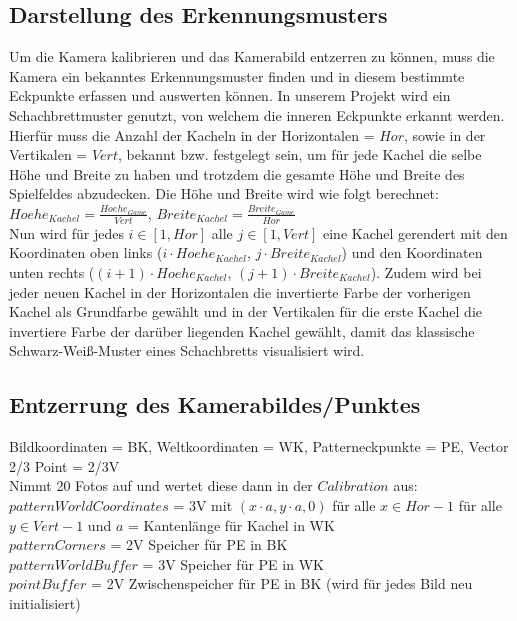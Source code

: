 \subsection{Darstellung des Erkennungsmusters}
Um die Kamera kalibrieren und das Kamerabild entzerren zu können, muss die Kamera ein bekanntes Erkennungsmuster finden und in diesem bestimmte Eckpunkte erfassen und auswerten können. In unserem Projekt wird ein Schachbrettmuster genutzt, von welchem die inneren Eckpunkte erkannt werden. Hierfür muss die Anzahl der Kacheln in der Horizontalen = $Hor$, sowie in der Vertikalen = $Vert$, bekannt bzw. festgelegt sein, um für jede Kachel die selbe Höhe und Breite zu haben und trotzdem die gesamte Höhe und Breite des Spielfeldes abzudecken. Die Höhe und Breite wird wie folgt berechnet:\\
$Hoehe_{Kachel} = \frac{Hoehe_{Game}}{Vert}$, $Breite_{Kachel} = \frac{Breite_{Game}}{Hor}$\\
Nun wird für jedes $i \in [1,Hor]$ alle $j \in [1,Vert]$ eine Kachel gerendert mit den Koordinaten oben links ($i \cdot Hoehe_{Kachel}$, $j \cdot Breite_{Kachel}$) und den Koordinaten unten rechts ($(i+1) \cdot Hoehe_{Kachel}$, $(j+1) \cdot Breite_{Kachel}$). Zudem wird bei jeder neuen Kachel in der Horizontalen die invertierte Farbe der vorherigen Kachel als Grundfarbe gewählt und in der Vertikalen für die erste Kachel die invertiere Farbe der darüber liegenden Kachel gewählt, damit das klassische Schwarz-Weiß-Muster eines Schachbretts visualisiert wird.

\subsection{Entzerrung des Kamerabildes/Punktes}
Bildkoordinaten = BK, Weltkoordinaten = WK, Patterneckpunkte = PE, Vector 2/3 Point = 2/3V\\
Nimmt 20 Fotos auf und wertet diese dann in der $Calibration$ aus:\\
$patternWorldCoordinates$ = 3V mit $(x \cdot a,y \cdot a,0)$ für alle $x \in Hor-1$ für alle $y \in Vert-1$ und $a$ = Kantenlänge für Kachel in WK\\
$patternCorners$ = 2V Speicher für PE in BK\\
$patternWorldBuffer$ = 3V Speicher für PE in WK\\
$pointBuffer$ = 2V Zwischenspeicher für PE in BK (wird für jedes Bild neu initialisiert)\\

